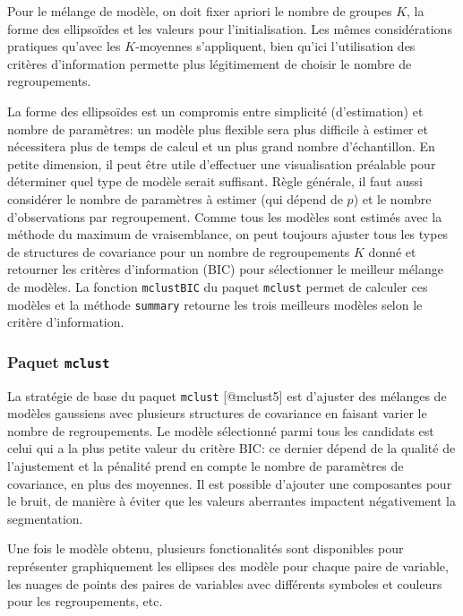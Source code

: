 \documentclass[
  11pt,
  letterpaper,
]{book}
\theoremstyle{definition}
\theoremstyle{remark}
\begin{document}
Pour le mélange de modèle, on doit fixer apriori le nombre de groupes
\(K\), la forme des ellipsoïdes et les valeurs pour l'initialisation.
Les mêmes considérations pratiques qu'avec les \(K\)-moyennes
s'appliquent, bien qu'ici l'utilisation des critères d'information
permette plus légitimement de choisir le nombre de regroupements.

La forme des ellipsoïdes est un compromis entre simplicité
(d'estimation) et nombre de paramètres: un modèle plus flexible sera
plus difficile à estimer et nécessitera plus de temps de calcul et un
plus grand nombre d'échantillon. En petite dimension, il peut être utile
d'effectuer une visualisation préalable pour déterminer quel type de
modèle serait suffisant. Règle générale, il faut aussi considérer le
nombre de paramètres à estimer (qui dépend de \(p\)) et le nombre
d'observations par regroupement. Comme tous les modèles sont estimés
avec la méthode du maximum de vraisemblance, on peut toujours ajuster
tous les types de structures de covariance pour un nombre de
regroupements \(K\) donné et retourner les critères d'information (BIC)
pour sélectionner le meilleur mélange de modèles. La fonction
\texttt{mclustBIC} du paquet \texttt{mclust} permet de calculer ces
modèles et la méthode \texttt{summary} retourne les trois meilleurs
modèles selon le critère d'information.

\hypertarget{paquet-mclust}{%
\subsubsection{\texorpdfstring{Paquet
\texttt{mclust}}{Paquet mclust}}\label{paquet-mclust}}

La stratégie de base du paquet \texttt{mclust} {[}@mclust5{]} est
d'ajuster des mélanges de modèles gaussiens avec plusieurs structures de
covariance en faisant varier le nombre de regroupements. Le modèle
sélectionné parmi tous les candidats est celui qui a la plus petite
valeur du critère BIC: ce dernier dépend de la qualité de l'ajustement
et la pénalité prend en compte le nombre de paramètres de covariance, en
plus des moyennes. Il est possible d'ajouter une composantes pour le
bruit, de manière à éviter que les valeurs aberrantes impactent
négativement la segmentation.

Une fois le modèle obtenu, plusieurs fonctionalités sont disponibles
pour représenter graphiquement les ellipses des modèle pour chaque paire
de variable, les nuages de points des paires de variables avec
différents symboles et couleurs pour les regroupements, etc.
\end{document}
